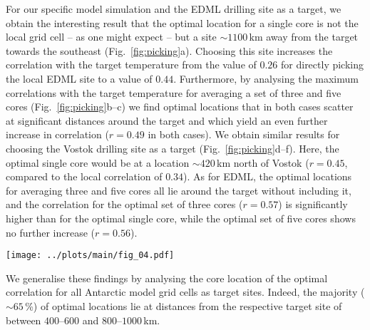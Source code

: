 \documentclass[cp, manuscript]{copernicus}
\begin{document}
For our specific model simulation and the EDML drilling site as a target, we
obtain the interesting result that the optimal location for a single core is not
the local grid cell -- as one might expect -- but a site $\sim1100$\,km away
from the target towards the southeast (Fig.~\ref{fig:picking}a). Choosing this
site increases the correlation with the target temperature from the value of
$0.26$ for directly picking the local EDML site to a value of
$0.44$. Furthermore, by analysing the maximum correlations with the target
temperature for averaging a set of three and five cores
(Fig.~\ref{fig:picking}b--c) we find optimal locations that in both cases
scatter at significant distances around the target and which yield an even
further increase in correlation ($r=0.49$ in both cases). We
obtain similar results for choosing the Vostok drilling site as a target
(Fig.~\ref{fig:picking}d--f). Here, the optimal single core would be at a
location $\sim420$\,km north of Vostok ($r=0.45$, compared to the local
correlation of $0.34$). As for EDML, the optimal locations for averaging three
and five cores all lie around the target without including it, and the
correlation for the optimal set of three cores ($r=0.57$) is significantly
higher than for the optimal single core, while the optimal set of five cores
shows no further increase ($r=0.56$).

\begin{figure*}[t]%
\centering
\texttt{[image: ../plots/main/fig\_04.pdf]}
\caption[Picking optimal sites]{%
  Picking ice core locations that optimally reconstruct interannual temperatures
  at the EDML and Vostok drilling sites. The maps show the correlation in the
  model data between the annual temperature time series at the target sites
  (black crosses) EDML (\textbf{a}--\textbf{c}) and Vostok
  (\textbf{d}--\textbf{f}) with the fields of precipitation-weighted oxygen
  isotope composition. Filled black circles denote those grid cells that
  maximise the correlation with the target site temperature for choosing either
  a single grid cell ($N=1$; \textbf{a}, \textbf{d}) or for averaging across
  $N=3$ (\textbf{b}, \textbf{e}) or $N=5$ (\textbf{c}, \textbf{f}) grid cells.}
\label{fig:picking}%
\end{figure*}%

We generalise these findings by analysing the core location of the optimal
correlation for all Antarctic model grid cells as target sites. Indeed, the
majority ($\sim65$\,\%) of optimal locations lie at distances from the
respective target site of between $400$--$600$ and $800$--$1000$\,km.
\end{document}
